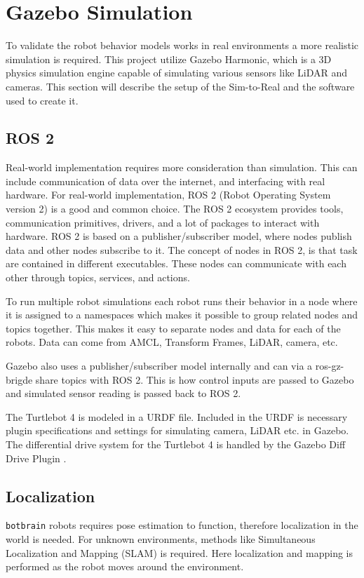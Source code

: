 \section{Gazebo Simulation}
To validate the robot behavior models works in real environments a more realistic simulation is required.
This project utilize Gazebo Harmonic, which is a 3D physics simulation engine capable of simulating various sensors like LiDAR and cameras.
This section will describe the setup of the {\color{red}Sim-to-Real} and the software used to create it.

\subsection{ROS 2}\label{sub:ros_2}
Real-world implementation requires more consideration than simulation. This can include communication of data over the internet, and interfacing with real hardware.
For real-world implementation, ROS 2 (Robot Operating System version 2) is a good and common choice. The ROS 2 ecosystem provides tools, communication primitives, drivers, and a lot of packages to interact with hardware. ROS 2 is based on a publisher/subscriber model, where nodes publish data and other nodes subscribe to it.
The concept of nodes in ROS 2, is that task are contained in different executables. These nodes can communicate with each other through topics, services, and actions.

To run multiple robot simulations each robot runs their behavior in a node where it is assigned to a namespaces which makes it possible to group related nodes and topics together. 
This makes it easy to separate nodes and data for each of the robots. Data can come from AMCL, Transform Frames, LiDAR, camera, etc.

Gazebo also uses a publisher/subscriber model internally and can via a ros-gz-brigde share topics with ROS 2. This is how control inputs are passed to Gazebo and simulated sensor reading is passed back to ROS 2.

The Turtlebot 4 is modeled in a URDF file. Included in the URDF is necessary plugin specifications and settings for simulating camera, LiDAR etc. in Gazebo. The differential drive system for the Turtlebot 4 is handled by the Gazebo Diff Drive Plugin \cite{gz-diff-drive}.

\subsection{Localization}\label{sub:localization} 
\texttt{botbrain} robots requires pose estimation to function, therefore localization in the world is needed.
For unknown environments, methods like Simultaneous Localization and Mapping (SLAM) is required. Here localization and mapping is performed as the robot moves around the environment.

